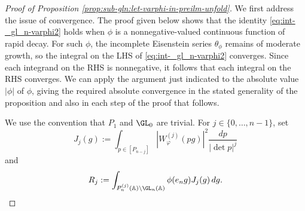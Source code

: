 \begin{proof}[Proof of Proposition \ref{prop:sub-gln:let-varphi-in-preilm-unfold}]
  We first address the issue of convergence.  The proof given below shows that the identity \eqref{eq:int-_gl_n-varphi2} holds when $\phi$ is a nonnegative-valued continuous function of rapid decay.  For such $\phi$, the incomplete Eisenstein series $\theta_\phi$ remains of moderate growth, so the integral on the LHS of \eqref{eq:int-_gl_n-varphi2} converges.  Since each integrand on the RHS is nonnegative, it follows that each integral on the RHS converges.  We can apply the argument just indicated to the absolute value $|\phi|$ of $\phi$, giving the required absolute convergence in the stated generality of the proposition and also in each step of the proof that follows.

  We use the convention that $P_1$ and $\GL_0$ are trivial.  For $j \in \{0,\dotsc,n-1\}$, set
  \begin{equation*}
    J_j(g)
    :=
    \int_{p \in [P_{n-j}]}
    \left\lvert W_\varphi^{(j)}(p g) \right\rvert^2
    \frac{d p}{\lvert \det p \rvert^j}
  \end{equation*}
  and
  \begin{equation*}
    R_j
    :=
    \int_{P_n^{(j)}(\mathbb{A}) \backslash \GL_n(\mathbb{A})}
    \phi(e_n g) J_j(g)\, d g.
  \end{equation*}


\end{proof}
